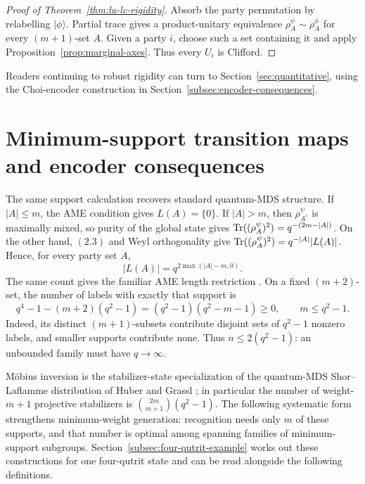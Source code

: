 \begin{proof}[Proof of Theorem~\ref{thm:lu-lc-rigidity}]
Absorb the party permutation by relabelling \(\lvert\phi\rangle\).  Partial
trace gives a product-unitary equivalence
\(\rho^\psi_A\sim\rho^\phi_A\) for every \((m+1)\)-set \(A\).  Given a
party \(i\), choose such a set containing it and apply
Proposition~\ref{prop:marginal-axes}.  Thus every \(U_i\) is Clifford.
\end{proof}

Readers continuing to robust rigidity can turn to Section~\ref{sec:quantitative},
using the Choi-encoder construction in Section~\ref{subsec:encoder-consequences}.

\section{Minimum-support transition maps and encoder consequences}
\label{sec:atlas}

The same support calculation recovers standard quantum-MDS structure.
If \(|A|\leq m\), the AME condition gives \(L(A)=\{0\}\).  If
\(|A|>m\), then \(\rho^\psi_{A^c}\) is maximally mixed, so purity of the
global state gives
\(\operatorname{Tr}((\rho^\psi_A)^2)=q^{-(2m-|A|)}\).  On the other hand, \((2.3)\)
and Weyl orthogonality give
\(\operatorname{Tr}((\rho^\psi_A)^2)=q^{-|A|}|L(A)|\).  Hence, for every party set
\(A\),
\begin{equation}
 |L(A)|=q^{2\max(|A|-m,0)}.                              \label{eq:atlas-support-size}
\end{equation}
The same count gives the familiar AME length restriction
\cite[Theorem~10]{HuberGrassl2020}.  On a fixed \((m+2)\)-set, the number
of labels with exactly that support is
\begin{equation}
 q^4-1-(m+2)(q^2-1)=(q^2-1)(q^2-m-1)\geq0,
 \qquad m\leq q^2-1.
 \label{eq:ame-length-bound}
\end{equation}
Indeed, its distinct \((m+1)\)-subsets contribute disjoint sets of
\(q^2-1\) nonzero labels, and smaller supports contribute none.
Thus \(n\leq2(q^2-1)\): an unbounded family must have \(q\to\infty\).

M\"obius inversion is the stabilizer-state specialization of the
quantum-MDS Shor--Laflamme distribution of Huber and Grassl
\cite[Theorems~8 and 9]{HuberGrassl2020}; in particular the number of
weight-\(m+1\) projective stabilizers is
\(\binom{2m}{m+1}(q^2-1)\).  The following systematic form strengthens
minimum-weight generation: recognition needs only \(m\) of these supports,
and that number is optimal among spanning families of minimum-support
subgroups.  Section~\ref{subsec:four-qutrit-example} works out these
constructions for one four-qutrit state and can be read alongside the
following definitions.

